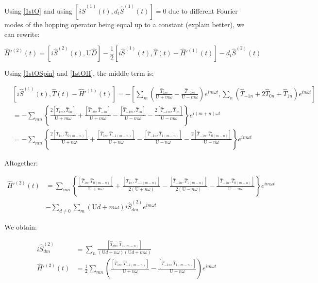 Using \ref{1stO} and using $\left[ i\hat{S}^{(1)}(t), d_t\hat{S}^{(1)}(t)\right] = 0$ due to different Fourier modes of the hopping operator being equal up to a constant (explain better), we can rewrite:

\begin{equation}
\hat{H}'^{(2)}(t) = \left[i\hat{S}^{(2)}(t), \text{U} \hat{D} \right] - \frac{1}{2}\left[ i\hat{S}^{(1)}(t), \hat{T}(t) - \hat{H}'^{(1)}(t)\right] - d_t\hat{S}^{(2)}(t)
\end{equation}

Using \ref{1stOSpin} and \ref{1stOH}, the middle term is:

\begin{align*}
&\left[ i\hat{S}^{(1)}(t), \hat{T}(t) - \hat{H}'^{(1)}(t)\right] = -\left[\sum_m \left( \frac{\hat{T}_{1m}}{\text{U}+m\omega} - \frac{\hat{T}_{-1m}}{\text{U}-m\omega} \right)e^{im \omega t}, \sum_n \left( \hat{T}_{-1n} + 2\hat{T}_{0n} + \hat{T}_{1n} \right) e^{in\omega t} \right] \\
&= -\sum_{mn} \left\{ \frac{2\left[\hat{T}_{1m}, \hat{T}_{0n} \right]}{\text{U}+m\omega} + \frac{\left[\hat{T}_{1m}, \hat{T}_{-1n} \right]}{\text{U}+m\omega} - \frac{\left[\hat{T}_{-1m}, \hat{T}_{1n} \right]}{\text{U}-m\omega} - \frac{2\left[\hat{T}_{-1m}, \hat{T}_{0n} \right]}{\text{U}-m\omega} \right\} e^{i(m+n)\omega t} \\
&= -\sum_{mn} \left\{ \frac{2\left[\hat{T}_{1n}, \hat{T}_{0(m-n)} \right]}{\text{U}+n\omega} + \frac{\left[\hat{T}_{1n}, \hat{T}_{-1(m-n)} \right]}{\text{U}+n\omega} - \frac{\left[\hat{T}_{-1n}, \hat{T}_{1(m-n)} \right]}{\text{U}-n\omega} - \frac{2\left[\hat{T}_{-1n}, \hat{T}_{0(m-n)} \right]}{\text{U}-n\omega} \right\} e^{im\omega t}
\end{align*}

Altogether:

\begin{align*}
\hat{H}'^{(2)}(t) &= \sum_{mn} \left\{ \frac{\left[\hat{T}_{1n}, \hat{T}_{0(m-n)} \right]}{\text{U}+n\omega} + \frac{\left[\hat{T}_{1n}, \hat{T}_{-1(m-n)} \right]}{2(\text{U}+n\omega)} - \frac{\left[\hat{T}_{-1n}, \hat{T}_{1(m-n)} \right]}{2(\text{U}-n\omega)} - \frac{\left[\hat{T}_{-1n}, \hat{T}_{0(m-n)} \right]}{\text{U}-n\omega} \right\} e^{im\omega t} \\
&-\sum_{d\neq 0}\sum_m (\text{U}d+m\omega) i\hat{S}^{(2)}_{dm} e^{im\omega t}
\end{align*}

We obtain:

\begin{align}
i\hat{S}^{(2)}_{dm} &= \sum_n \frac{\left[ \hat{T}_{dn}, \hat{T}_{0(m-n)} \right]}{(\text{U}d+n\omega)(\text{U}d+m\omega)} \label{2ndOSpin}\\
\hat{H}'^{(2)}(t) &= \frac{1}{2}\sum_{mn} \left( \frac{\left[\hat{T}_{1n}, \hat{T}_{-1(m-n)} \right]}{\text{U}+n\omega} - \frac{\left[\hat{T}_{-1n}, \hat{T}_{1(m-n)} \right]}{\text{U}-n\omega} \right) e^{im\omega t} \label{2ndOH}
\end{align}


